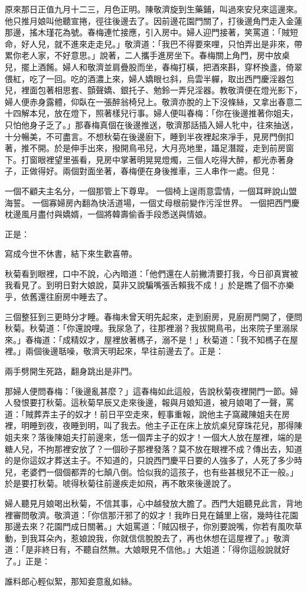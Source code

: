 原來那日正值九月十二三，月色正明。陳敬濟旋到生藥鋪，叫過來安兒來這邊來。他只推月娘叫他聽宣捲，徑往後邊去了。因前邊花園門關了，打後邊角門走入金蓮那邊，搖木瑾花為號。春梅連忙接應，引入房中。婦人迎門接著，笑罵道：「賊短命，好人兒，就不進來走走兒。」敬濟道：「我巴不得要來哩，只怕弄出是非來，帶累你老人家，不好意思。」說著，二人攜手進房坐下。春梅關上角門，房中放桌兒，擺上酒餚。婦人和敬濟並肩疊股而坐，春梅打橫，把酒來斟，穿杯換盞，倚翠偎紅，吃了一回。吃的酒濃上來，婦人嬌眼乜斜，烏雲半軃，取出西門慶淫器包兒，裡面包著相思套、顫聲嬌、銀托子、勉鈴一弄兒淫器。教敬濟便在燈光影下，婦人便赤身露體，仰臥在一張醉翁椅兒上。敬濟亦脫的上下沒條絲，又拿出春意二十四解本兒，放在燈下，照著樣兒行事。婦人便叫春梅：「你在後邊推著你姐夫，只怕他身子乏了。」那春梅真個在後邊推送，敬濟那話插入婦人牝中，往來抽送，十分暢美，不可盡言。不想秋菊在後邊廚下，睡到半夜裡起來凈手，見房門倒扣著，推不開。於是伸手出來，撥開鳥弔兒，大月亮地里，躡足潛蹤，走到前房窗下。打窗眼裡望里張看，見房中掌著明晃晃燈燭，三個人吃得大醉，都光赤著身子，正做得好。兩個對面坐著，春梅便在身後推車，三人串作一處。但見：

一個不顧夫主名分，一個那管上下尊卑。
一個椅上逞雨意雲情，一個耳畔說山盟海誓。
一個寡婦房內翻為快活道場，一個丈母根前變作污淫世界。
一個把西門慶枕邊風月盡付與嬌婿，一個將韓壽偷香手段悉送與情娘。

正是：

寫成今世不休書，結下來生歡喜帶。

秋菊看到眼裡，口中不說，心內暗道：「他們還在人前撇清要打我，今日卻真實被我看見了。到明日對大娘說，莫非又說騙嘴張舌賴我不成！」於是瞧了個不亦樂乎，依舊還往廚房中睡去了。

三個整狂到三更時分才睡。春梅未曾天明先起來，走到廚房，見廚房門開了，便問秋菊。秋菊道：「你還說哩。我尿急了，往那裡溺？我拔開鳥弔，出來院子里溺尿來。」春梅道：「成精奴才，屋裡放著榪子，溺不是！」秋菊道：「我不知榪子在屋裡。」兩個後邊聒噪，敬濟天明起來，早往前邊去了。正是：

兩手劈開生死路，翻身跳出是非門。

那婦人便問春梅：「後邊亂甚麼？」這春梅如此這般，告說秋菊夜裡開門一節。婦人發恨要打秋菊。這秋菊早辰又走來後邊，報與月娘知道，被月娘喝了一聲，罵道：「賊葬弄主子的奴才！前日平空走來，輕事重報，說他主子窩藏陳姐夫在房裡，明睡到夜，夜睡到明，叫了我去。他主子正在床上放炕桌兒穿珠花兒，那得陳姐夫來？落後陳姐夫打前邊來，恁一個弄主子的奴才！一個大人放在屋裡，端的是糖人兒，不拘那裡安放了？一個砂子那裡發落？莫不放在眼裡不成？傳出去，知道的是你這奴才葬送主子。不知道的，只說西門慶平日要的人強多了，人死了多少時兒，老婆們一個個都弄的七顛八倒。恰似我的這孩子，也有些甚根兒不正一般。」於是要打秋菊。唬得秋菊往前邊疾走如飛，再不敢來後邊說了。

婦人聽見月娘喝出秋菊，不信其事，心中越發放大膽了。西門大姐聽見此言，背地裡審問敬濟。敬濟道：「你信那汗邪了的奴才！我昨日見在鋪里上宿，幾時往花園那邊去來？花園門成日關著。」大姐罵道：「賊囚根子，你別要說嘴，你若有風吹草動，到我耳朵內，惹娘說我，你就信信脫脫去了，再也休想在這屋裡了。」敬濟道：「是非終日有，不聽自然無。大娘眼見不信他。」大姐道：「得你這般說就好了。」正是：

誰料郎心輕似絮，那知妾意亂如絲。

